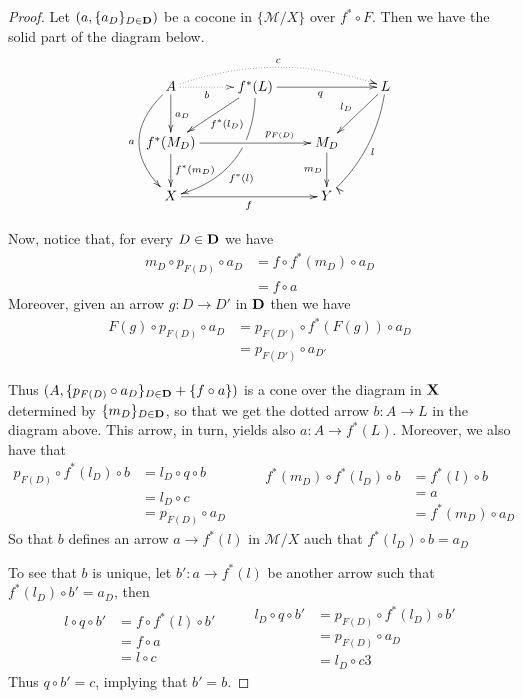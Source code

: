 \documentclass[a4paper,UKenglish,cleveref,pdftex,thm-restate,numberwithinsect]{lipics-v2021}
\def\D{\textbf {\textup{D}}}
\def\X{\textbf {\textup{X}}}
\begin{document}
\begin{proof}
	Let $(a, \{a_D\}_{D\in \D})$ be a cocone in $\{\mathcal{M}/X\}$ over $f^*\circ F$. Then we have the solid part of the diagram below.
	\[\xymatrix{A \ar@/_.8cm/[dd]_{a}\ar[d]^{a_D}  \ar@{.>}[r]_-{b} \ar@/^.5cm/@{.>}[rrr]^{c}&f^*(L)  \ar@/^.7cm/[ddl]|(.37)\hole^(.6){f^*(l)} \ar[rr]_{q} \ar[dl]^{f^*(l_D)}&&L \ar@/^.3cm/[ddl]^{l} \ar[dl]_{l_D}\\f^*(M_D)  \ar[d]^{f^*(m_D)} \ar[rr]^(.7){p_{F(D)}}&& M_D \ar[d]_{m_D} \\ X \ar[rr]_{f}&& Y }\]
	
	Now, notice that, for every $D\in \D$ we have
	\begin{align*}
		m_D\circ p_{F(D)} \circ a_D&=f\circ f^*(m_D)\circ a_D \\&=f\circ a
	\end{align*}
	Moreover, given an arrow $g\colon D\to D'$ in $\D$ then we have
	\begin{align*}
		F(g)\circ p_{F(D)}\circ a_D&=p_{F(D')}\circ f^*(F(g))\circ a_D\\&=p_{F(D')}\circ a_{D'}
	\end{align*}
	
	Thus $(A, \{p_{F(D)}\circ a_D\}_{D\in \D}+ \{f\circ a\})$ is a cone over the diagram in $\X$ determined by $\{m_D\}_{D\in \D}$, so that we get the dotted arrow $b\colon A\to L$ in the diagram above. This arrow,  in turn, yields also $a\colon A\to f^*(L)$. Moreover, we also have that
	\[
	\begin{split}
		p_{F(D)}\circ f^*(l_D)\circ b&= l_D\circ q \circ b\\&=l_D\circ c\\&=p_{F(D)}\circ a_D
	\end{split}\qquad 
	\begin{split}
		f^*(m_D) \circ f^*(l_D)\circ b&= f^*(l)\circ b\\&=a\\&=f^*(m_D)\circ a_D
	\end{split}
	\]
	So that $b$ defines an arrow $a\to f^*(l)$ in $\mathcal{M}/X$ auch that $f^*(l_D)\circ b =a_D$
	
	To see that $b$ is unique, let $b'\colon a\to f^*(l)$ be another arrow such that $f^*(l_D)\circ b' =a_D$, then
	\[\begin{split}
		l\circ q \circ b'&=f\circ f^*(l)\circ b'\\&=f\circ a\\&=l\circ c
	\end{split} \qquad \begin{split}
		l_D\circ q \circ b'&=p_{F(D)}\circ f^*(l_D)\circ b'\\&=p_{F(D)}\circ a_D\\&=l_D\circ c
		3\end{split}\]
	Thus $q\circ b'=c$, implying that $b'=b$.
\end{proof}
\end{document}
